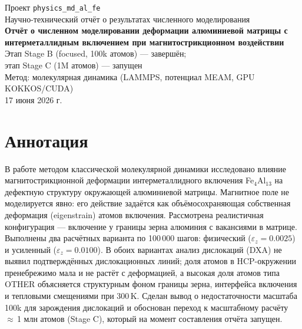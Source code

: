 \documentclass[14pt,a4paper]{extarticle}
\newcommand{\code}[1]{\texttt{#1}}
\begin{document}
\thispagestyle{empty}
\begin{center}
\vspace*{2.5cm}
{\large Проект \code{physics\_md\_al\_fe}}\\[0.4cm]
{\large Научно-технический отчёт о результатах численного моделирования}\\[2.2cm]

{\LARGE\bfseries Отчёт о численном моделировании деформации алюминиевой матрицы с интерметаллидным включением при магнитострикционном воздействии}\\[2.2cm]

{\large Этап Stage B (focused, 100k атомов) — завершён;\\[0.2cm]
этап Stage C (1M атомов) — запущен}\\[1.6cm]

{\large Метод: молекулярная динамика (LAMMPS, потенциал MEAM, GPU KOKKOS/CUDA)}\\[2.6cm]

\vfill
{\large 17 июня 2026 г.}
\end{center}
\newpage

\section*{Аннотация}
В работе методом классической молекулярной динамики исследовано влияние магнитострикционной деформации интерметаллидного включения Fe$_4$Al$_{13}$ на дефектную структуру окружающей алюминиевой матрицы. Магнитное поле не моделируется явно: его действие задаётся как объёмосохраняющая собственная деформация (eigenstrain) атомов включения. Рассмотрена реалистичная конфигурация — включение у границы зерна алюминия с вакансиями в матрице. Выполнены два расчётных варианта по 100\,000 шагов: физический ($\varepsilon_z = 0.0025$) и усиленный ($\varepsilon_z = 0.0100$). В обоих вариантах анализ дислокаций (DXA) не выявил подтверждённых дислокационных линий; доля атомов в HCP-окружении пренебрежимо мала и не растёт с деформацией, а высокая доля атомов типа OTHER объясняется структурным фоном границы зерна, интерфейса включения и тепловыми смещениями при 300\,K. Сделан вывод о недостаточности масштаба 100k для зарождения дислокаций и обоснован переход к масштабному расчёту $\approx$\,1 млн атомов (Stage C), который на момент составления отчёта запущен.

\end{document}
